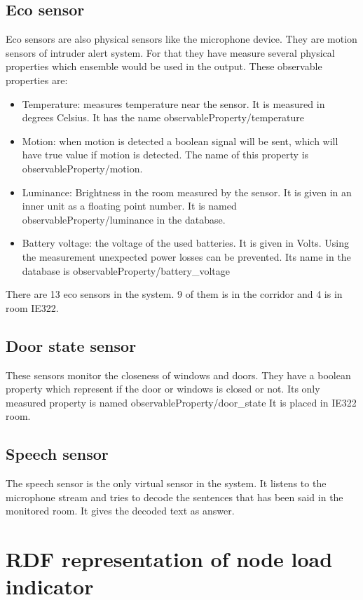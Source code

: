  \subsection*{Eco sensor}
 Eco sensors are also physical sensors like the microphone device. They are motion sensors of intruder alert system. For that they have measure several physical properties which ensemble would be used in the output. These observable properties are:
 \begin{itemize}
 \item Temperature: measures temperature near the sensor. It is measured in degrees Celsius. It has the name observableProperty/temperature
 \item Motion: when motion is detected a boolean signal will be sent, which will have true value if motion is detected. The name of this property is observableProperty/motion.
 \item Luminance: Brightness in the room measured by the sensor. It is given in an inner unit as a floating point number. It is named observableProperty/luminance in the database.
 \item Battery voltage: the voltage of the used batteries. It is given in Volts. Using the measurement unexpected power losses can be prevented. Its name in the database is observableProperty/battery\_voltage
 \end{itemize}
 There are 13 eco sensors in the system. 9 of them is in the corridor and 4 is in room IE322.  
 
 \subsection*{Door state sensor}
 These sensors monitor the closeness of windows and doors. They have a boolean property which represent if the door or windows is closed or not. Its only measured property is named observableProperty/door\_state
 It is placed in IE322 room.
 
\subsection*{Speech sensor}

The speech sensor is the only virtual sensor in the system. It listens to the microphone stream and tries to decode the sentences that has been said in the monitored room. It gives the decoded text as answer.

\section{RDF representation of node load indicator}

